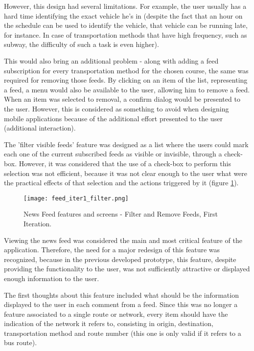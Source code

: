 However, this design had several limitations. For example, the user usually has a hard time identifying the exact vehicle he's in (despite the fact that an hour on the schedule can be used to identify the vehicle, that vehicle can be running late, for instance. In case of transportation methods that have high frequency, such as subway, the difficulty of such a task is even higher).


This would also bring an additional problem - along with adding a feed subscription for every transportation method for the chosen course, the same was required for removing those feeds.
By clicking on an item of the list, representing a feed, a menu would also be available to the user, allowing him to remove a feed. When an item was selected to removal, a confirm dialog would be presented to the user. However, this is considered as something to avoid when designing mobile applications because of the additional effort presented to the user (additional interaction).

The 'filter visible feeds' feature was designed as a list where the users could mark each one of the current subscribed feeds as visible or invisible, through a check-box. However, it was considered that the use of a check-box to perform this selection was not efficient, because it was not clear enough to the user what were the practical effects of that selection and the actions triggered by it (figure \ref{fig:feed_iter1_filter}).

\begin{figure}[htb]
  \begin{center}
    \leavevmode
    \texttt{[image: feed\_iter1\_filter.png]}
    \caption{News Feed features and screens - Filter and Remove Feeds, First Iteration.}
    \label{fig:feed_iter1_filter}
  \end{center}
\end{figure}


Viewing the news feed was considered the main and most critical feature of the application. Therefore, the need for a major redesign of this feature was recognized, because in the previous developed prototype, this feature, despite providing the functionality to the user, was not sufficiently attractive or displayed enough information to the user.

The first thoughts about this feature included what should be the information displayed to the user in each comment from a feed.
Since this was no longer a feature associated to a single route or network, every item should have the indication of the network it refers to, consisting in origin, destination, transportation method and route number (this one is only valid if it refers to a bus route).

